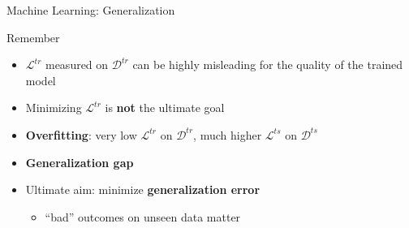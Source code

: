 \begin{frame}{Machine Learning: Generalization}
\protect\hypertarget{machine-learning-generalization-3}{}
\begin{block}{Remember}
\protect\hypertarget{remember}{}
\begin{itemize}
\item
  \(\mathcal{L}^{tr}\) measured on \(\mathcal{D}^{tr}\) can be highly
  misleading for the quality of the trained model
\item
  Minimizing \(\mathcal{L}^{tr}\) is \textbf{not} the ultimate goal
\end{itemize}
\end{block}

\begin{itemize}
\tightlist
\item
  \textbf{Overfitting}: very low \(\mathcal{L}^{tr}\) on
  \(\mathcal{D}^{tr}\), much higher \(\mathcal{L}^{ts}\) on
  \(\mathcal{D}^{ts}\)
\item
  \textbf{Generalization gap}
\item
  Ultimate aim: minimize \textbf{generalization error}

  \begin{itemize}
  \tightlist
  \item
    ``bad'' outcomes on unseen data matter
  \end{itemize}
\end{itemize}

\end{frame}

